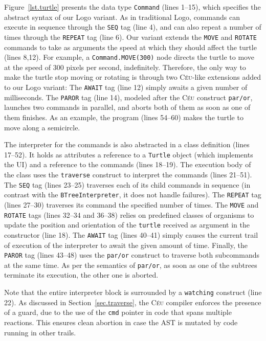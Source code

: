 \documentclass{sig-alternate}
\newcommand{\CEU}{\textsc{C\'{e}u}\xspace}
\newcommand{\code}[1] {{\small{\texttt{#1}}}}
\begin{document}
Figure~\ref{lst.turtle} presents the data type \code{Command} (lines 1--15), 
which specifies the abstract syntax of our Logo variant.
As in traditional Logo, commands can execute in sequence through the \code{SEQ} 
tag (line 4), and can also repeat a number of times through the \code{REPEAT} 
tag (line 6).
%
Our variant extends the \code{MOVE} and \code{ROTATE} commands to take as 
arguments the speed at which they should affect the turtle (lines 8,12).
For example, a \code{Command.MOVE(300)} node directs the turtle to move at the 
speed of 300 pixels per second, indefinitely.
%
Therefore, the only way to make the turtle stop moving or rotating is through 
two \CEU-like extensions added to our Logo variant:
The \code{AWAIT} tag (line 12) simply awaits a given number of milliseconds.
The \code{PAROR} tag (line 14), modeled after the \CEU construct \code{par/or},
launches two commands in parallel, and aborts both of them as soon as one of
them finishes.
%
As an example, the program (lines 54--60) makes the turtle to move along a 
semicircle.

The interpreter for the commands is also abstracted in a class definition 
(lines 17--52).
%
It holds as attributes a reference to a \code{Turtle} object (which implements 
the UI) and a reference to the commands (lines 18--19).
The execution body of the class uses the \code{traverse} construct to interpret 
the commands (lines 21--51).
%
The \code{SEQ} tag (lines 23--25) traverses each of its child commands in 
sequence (in contrast with the \code{BTreeInterpreter}, it does not handle 
failures).
%
The \code{REPEAT} tag (lines 27--30) traverses its command the specified number 
of times.
%
The \code{MOVE} and \code{ROTATE} tags (lines 32--34 and 36--38) relies on 
predefined classes of organisms to update the position and orientation of the 
\code{turtle} received as argument in the constructor (line 18).
%
The \code{AWAIT} tag (lines 40--41) simply causes the current trail of 
execution of the interpreter to await the given amount of time.
%
Finally, the \code{PAROR} tag (lines 43--48) uses the \code{par/or} construct
to traverse both subcommands at the same time. As per the semantics of
\code{par/or}, as soon as one of the subtrees terminate its execution,
the other one is aborted.

Note that the entire interpreter block is surrounded by a \code{watching}
construct (line 22).
As discussed in Section~\ref{sec.traverse}, the \CEU compiler enforces the 
presence of a guard, due to the use of the \code{cmd} pointer in code that 
spans multiple reactions. This ensures clean abortion in case the AST is 
mutated by code running in other trails.
\end{document}
